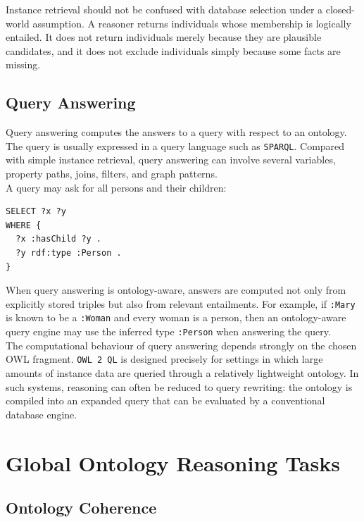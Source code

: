 \documentclass{scrbook}
\begin{document}
	Instance retrieval should not be confused with database selection under a closed-world assumption. A reasoner returns individuals whose membership is logically entailed. It does not return individuals merely because they are plausible candidates, and it does not exclude individuals simply because some facts are missing.
	
	\subsection{Query Answering}
	
	Query answering computes the answers to a query with respect to an ontology. The query is usually expressed in a query language such as \texttt{SPARQL}. Compared with simple instance retrieval, query answering can involve several variables, property paths, joins, filters, and graph patterns.\\
	
	A query may ask for all persons and their children:
	
	\begin{lstlisting}
SELECT ?x ?y
WHERE {
  ?x :hasChild ?y .
  ?y rdf:type :Person .
}
	\end{lstlisting}
	
	When query answering is ontology-aware, answers are computed not only from explicitly stored triples but also from relevant entailments. For example, if \texttt{:Mary} is known to be a \texttt{:Woman} and every woman is a person, then an ontology-aware query engine may use the inferred type \texttt{:Person} when answering the query.\\
	
	The computational behaviour of query answering depends strongly on the chosen OWL fragment. \texttt{OWL 2 QL} is designed precisely for settings in which large amounts of instance data are queried through a relatively lightweight ontology. In such systems, reasoning can often be reduced to query rewriting: the ontology is compiled into an expanded query that can be evaluated by a conventional database engine.
	
	\section{Global Ontology Reasoning Tasks}
	
	\subsection{Ontology Coherence}
	
\end{document}
